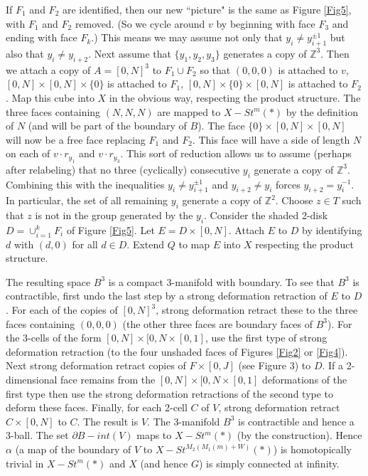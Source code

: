 \documentclass[12pt]{article}
\numberwithin{equation}{section}
\begin{document}
If $F_1$ and $F_2$ are identified, then our new ``picture" is the same as Figure \ref{Fig5}, with $F_1$ and $F_2$ removed. (So we cycle around $v$ by beginning with face $F_3$ and ending with face $ F_k$.) This means we may assume not only that $y_i\ne y_{i+1}^{\pm1}$ but also that $y_i\ne y_{i+2}$. Next assume that $\{y_1,y_2,y_3\}$ generates a copy of $\mathbb Z^3$. Then we attach a copy of $A=[0,N]^3$ to $F_1\cup F_2$ so that $(0,0,0)$ is attached to $v$, $[0,N]\times [0,N]\times \{0\}$ is attached to $F_1$, $[0,N]\times \{0\}\times [0,N]$ is attached to $F_2$. Map this cube into $X$ in the obvious way, respecting the product structure. The three faces containing $(N,N,N)$ are mapped to $X-St^m(\ast)$ by the definition of $N$ (and will be part of the boundary of $B$). The face $\{0\}\times [0,N]\times [0,N]$ will now be a free face replacing $F_1$ and $F_2$. This face will have a side of length $N$ on each of $v\cdot r_{y_1}$ and $v\cdot r_{y_3}$. This sort of reduction allows us to assume (perhaps after relabeling) that no three (cyclically) consecutive $y_i$ generate a copy of $\mathbb Z^3$.  Combining this with the inequalities $y_i\ne y_{i+1}^{\pm1}$ and $y_{i+2}\ne y_i$ forces $y_{i+2}=y_i^{-1}$. In particular, the set of all remaining $y_i$ generate a copy of $\mathbb Z^2$. Choose $z\in T$ such that $z$ is not in the group generated by the $y_i$. Consider the shaded 2-disk $D=\cup_{i=1}^kF_i$ of Figure \ref{Fig5}. Let $E=D\times [0,N]$. Attach $E$ to $D$ by identifying $d$ with $(d,0)$ for all  $d\in D$. Extend $Q$ to map $E$ into $X$ respecting the product structure. 

The resulting space $B^3$ is a compact 3-manifold with boundary. To see that $B^3$ is contractible, first undo the last step by a strong deformation retraction of $E$ to $D$. For each of the copies of $[0,N]^3$, strong deformation retract these to the three faces containing $(0,0,0)$ (the other three faces are boundary faces of $B^3$). For the 3-cells of the form $[0,N]\times[0,N\times [0,1]$, use the first type of strong deformation retraction (to the four unshaded faces of Figures \ref{Fig2} or \ref{Fig4}). Next strong deformation retract copies of $F\times [0,J]$ (see Figure 3) to $D$. If a 2-dimensional face remains from the  $[0,N]\times[0,N\times [0,1]$
deformations of the first type then use the strong deformation retractions of the second type to deform these faces. Finally, for each 2-cell $C$ of $V$, strong deformation retract $C\times [0,N]$ to $C$. The result is $V$. The 3-manifold $B^3$ is contractible and hence a 3-ball. The set $\partial B-int(V)$ maps to $X-St^m(\ast)$ (by the construction). Hence $\alpha$ (a map of the boundary of $V$ to $X-St^{M_2(M_1(m)+W)}(\ast)$) is homotopically trivial in $X-St^m(\ast)$ and $X$ (and hence $G$) is simply connected at infinity. 
\end{document}
